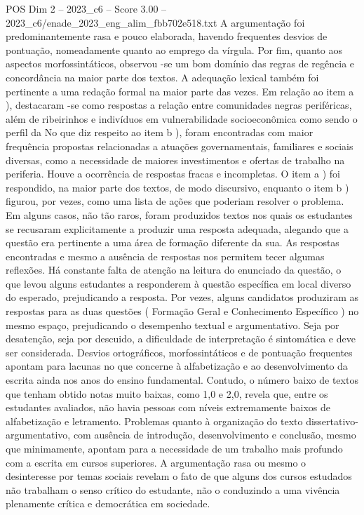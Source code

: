 \begin{textsample}{POS Dim 2 – 2023\_c6 – Score 3.00 – 2023\_c6/enade\_2023\_eng\_alim\_fbb702e518.txt}
A argumentação foi predominantemente rasa e pouco elaborada, havendo frequentes desvios de pontuação, nomeadamente quanto ao emprego da vírgula.
Por fim, quanto aos aspectos morfossintáticos, observou -se um bom domínio das regras de regência e concordância na maior parte dos textos.
A adequação lexical também foi pertinente a uma redação formal na maior parte das vezes.
Em relação ao item a ), destacaram -se como respostas a relação entre comunidades negras periféricas, além de ribeirinhos e indivíduos em vulnerabilidade socioeconômica como sendo o perfil da No que diz respeito ao item b ), foram encontradas com maior frequência propostas relacionadas a atuações governamentais, familiares e sociais diversas, como a necessidade de maiores investimentos e ofertas de trabalho na periferia.
Houve a ocorrência de respostas fracas e incompletas.
O item a ) foi respondido, na maior parte dos textos, de modo discursivo, enquanto o item b ) figurou, por vezes, como uma lista de ações que poderiam resolver o problema.
Em alguns casos, não tão raros, foram produzidos textos nos quais os estudantes se recusaram explicitamente a produzir uma resposta adequada, alegando que a questão era pertinente a uma área de formação diferente da sua.
As respostas encontradas e mesmo a ausência de respostas nos permitem tecer algumas reflexões.
Há constante falta de atenção na leitura do enunciado da questão, o que levou alguns estudantes a responderem à questão específica em local diverso do esperado, prejudicando a resposta.
Por vezes, alguns candidatos produziram as respostas para as duas questões ( Formação Geral e Conhecimento Específico ) no mesmo espaço, prejudicando o desempenho textual e argumentativo.
Seja por desatenção, seja por descuido, a dificuldade de interpretação é sintomática e deve ser considerada.
Desvios ortográficos, morfossintáticos e de pontuação frequentes apontam para lacunas no que concerne à alfabetização e ao desenvolvimento da escrita ainda nos anos do ensino fundamental.
Contudo, o número baixo de textos que tenham obtido notas muito baixas, como 1,0 e 2,0, revela que, entre os estudantes avaliados, não havia pessoas com níveis extremamente baixos de alfabetização e letramento.
Problemas quanto à organização do texto dissertativo-argumentativo, com ausência de introdução, desenvolvimento e conclusão, mesmo que minimamente, apontam para a necessidade de um trabalho mais profundo com a escrita em cursos superiores.
A argumentação rasa ou mesmo o desinteresse por temas sociais revelam o fato de que alguns dos cursos estudados não trabalham o senso crítico do estudante, não o conduzindo a uma vivência plenamente crítica e democrática em sociedade.

\end{textsample}
